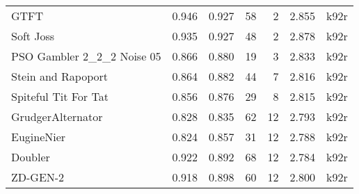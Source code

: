 \begin{tabular}{lrrrrrl}
GTFT                       &                               0.946 &                            0.927 &            58 &     2 &  2.855 &                  k92r \\
Soft Joss                  &                               0.935 &                            0.927 &            48 &     2 &  2.878 &                  k92r \\
PSO Gambler 2\_2\_2 Noise 05 &                               0.866 &                            0.880 &            19 &     3 &  2.833 &                  k92r \\
Stein and Rapoport         &                               0.864 &                            0.882 &            44 &     7 &  2.816 &                  k92r \\
Spiteful Tit For Tat       &                               0.856 &                            0.876 &            29 &     8 &  2.815 &                  k92r \\
GrudgerAlternator          &                               0.828 &                            0.835 &            62 &    12 &  2.793 &                  k92r \\
EugineNier                 &                               0.824 &                            0.857 &            31 &    12 &  2.788 &                  k92r \\
Doubler                    &                               0.922 &                            0.892 &            68 &    12 &  2.784 &                  k92r \\
ZD-GEN-2                   &                               0.918 &                            0.898 &            60 &    12 &  2.800 &                  k92r \\
\bottomrule
\end{tabular}
